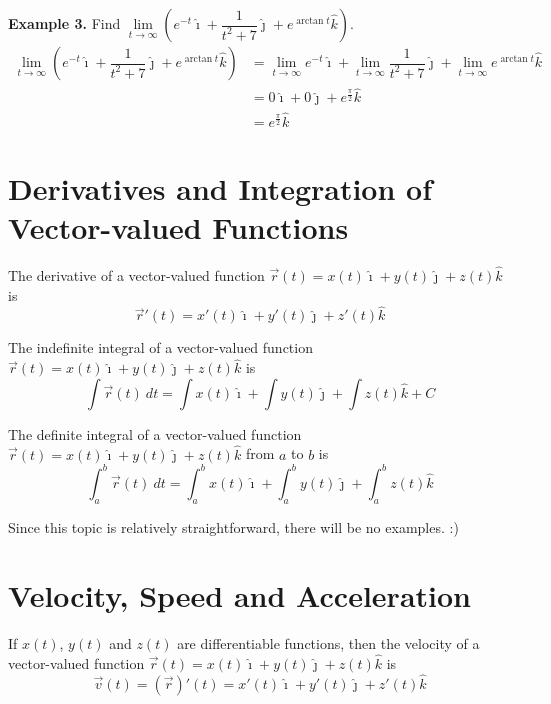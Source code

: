 \documentclass{report}
\begin{document}
\noindent\textbf{Example 3. } Find $\lim\limits_{t \to \infty}(e^{-t}\hat{\imath} + \dfrac{1}{t^2 + 7}\hat{\jmath} + e^{\arctan{t}}\hat{k})$.
\begin{align*}
    \lim_{t \to \infty} (e^{-t}\hat{\imath} + \dfrac{1}{t^2 + 7}\hat{\jmath} + e^{\arctan{t}}\hat{k}) & = \lim_{t \to \infty} e^{-t}\hat{\imath} + \lim_{t \to \infty} \dfrac{1}{t^2 + 7}\hat{\jmath} + \lim_{t \to \infty} e^{\arctan{t}}\hat{k} \\
                                                                                                      & = 0\hat{\imath} + 0\hat{\jmath} + e^{\frac{\pi}{2}}\hat{k}                                                                                \\
                                                                                                      & = e^{\frac{\pi}{2}}\hat{k}
\end{align*}

\chapter{Derivatives and Integration of Vector-valued Functions}

The derivative of a vector-valued function $\vec{r}(t) = x(t)\hat{\imath} +
    y(t)\hat{\jmath} + z(t)\hat{k}$ is \[\vec{r}'(t) = x'(t)\hat{\imath} +
    y'(t)\hat{\jmath} + z'(t)\hat{k}\]

The indefinite integral of a vector-valued function $\vec{r}(t) =
    x(t)\hat{\imath} + y(t)\hat{\jmath} + z(t)\hat{k}$ is \[\int \vec{r}(t)\ dt = \int x(t)\hat{\imath} + \int y(t)\hat{\jmath} + \int z(t)\hat{k} + C\]

The definite integral of a vector-valued function $\vec{r}(t) =
    x(t)\hat{\imath} + y(t)\hat{\jmath} + z(t)\hat{k}$ from $a$ to $b$ is \[\int_a^b \vec{r}(t)\ dt = \int_a^b x(t)\hat{\imath} + \int_a^b y(t)\hat{\jmath} + \int_a^b z(t)\hat{k}\]

Since this topic is relatively straightforward, there will be no examples. :)

\chapter{Velocity, Speed and Acceleration}

If $x(t)$, $y(t)$ and $z(t)$ are differentiable functions, then the velocity of
a vector-valued function $\vec{r}(t) = x(t)\hat{\imath} + y(t)\hat{\jmath} +
    z(t)\hat{k}$ is \[\vec{v}(t) = (\vec{r})'(t) = x'(t)\hat{\imath} + y'(t)\hat{\jmath} + z'(t)\hat{k}\]
\end{document}
